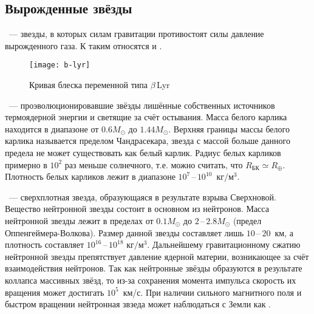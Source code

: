 \subsection{Вырожденные звёзды}
~--- звезды, в которых силам гравитации противостоят силы давление вырожденного газа. К таким относятся  и .

\begin{figure}[!h]
    \centering
    \begin{minipage}[c]{0.49\tw}
    \end{minipage}
    \hfill
    \begin{minipage}[c]{0.49\tw}
        \centering
        \texttt{[image: b-lyr]}
    \end{minipage}
    \caption{Кривая блеска переменной типа $\beta$\,Lyr}
    \label{pic:b-lyr}
    \vspace{-.8pc}
\end{figure}
~--- проэволюционировавшие звёзды лишённые собственных источников термоядерной энергии и светящие за счёт остывания. Масса белого карлика находится в диапазоне от $0.6M_{\odot}$ до $1.44 M_{\odot}$. Верхняя границы массы белого карлика называется пределом Чандрасекара, звезда с массой больше данного предела не может существовать как белый карлик. Радиус белых карликов примерно в $10^2$ раз меньше солнечного, т.е. можно считать, что $R_\text{БК} \simeq R_\oplus$. Плотность белых карликов лежит в диапазоне $10^7$\,--\,$10^{10}$~$\text{кг}/\text{м}^3$.

~--- сверхплотная звезда, образующаяся в результате взрыва Сверхновой. Вещество нейтронной звезды состоит в основном из нейтронов. Масса нейтронной звезды лежит в пределах от $0.1M_{\odot}$ до $2$\,--\,$2.8M_{\odot}$ (предел Оппенгеймера-Волкова). Размер данной звезды составляет лишь $10$\,--\,$20$~км, а плотность составляет $10^{16}$\,--\,$10^{18}$ $\text{кг}/\text{м}^3$.  Дальнейшему гравитационному сжатию нейтронной звезды препятствует давление ядерной материи, возникающее за счёт взаимодействия нейтронов. Так как нейтронные звёзды образуются в результате  коллапса массивных звёзд, то из-за сохранения момента импульса скорость их вращения может достигать $10^5$~км/с. При наличии сильного магнитного поля и быстром вращении нейтронная звзеда может наблюдаться с Земли как .
